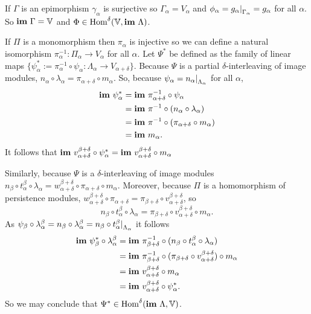  If $\Gamma$ is an epimorphism $\gamma_\alpha$ is surjective so $\Gamma_\alpha = V_\alpha$ and $\phi_{\alpha} = g_{\alpha}\mathord{\mid}_{\Gamma_\alpha} = g_\alpha$ for all $\alpha$.
  So $\mathbf{im}~\Gamma = \mathbb{V}$ and $\Phi\in\mathrm{Hom}^\delta(\mathbb{V},\mathbf{im}~\Lambda)$.

  If $\Pi$ is a monomorphism then $\pi_\alpha$ is injective so we can define a natural isomorphism $\pi_\alpha^{-1} : \Pi_\alpha\to V_\alpha$ for all $\alpha$.
  Let $\Psi^*$ be defined as the family of linear maps $\{\psi_\alpha^* := \pi^{-1}_\alpha \circ \psi_\alpha : \Lambda_\alpha\to V_{\alpha+\delta}\}$.
  Because $\Psi$ is a partial $\delta$-interleaving of image modules, $n_\alpha\circ\lambda_\alpha = \pi_{\alpha+\delta}\circ m_\alpha$.
  So, because $\psi_\alpha = n_\alpha\mathord{\mid}_{\Lambda_\alpha}$ for all $\alpha$,
  \begin{align*}
    \mathbf{im}~\psi_\alpha^* &= \mathbf{im}~\pi^{-1}_{\alpha+\delta}\circ\psi_\alpha\\
                      &= \mathbf{im}~\pi^{-1}\circ (n_\alpha\circ\lambda_\alpha)\\
                      &= \mathbf{im}~\pi^{-1}\circ (\pi_{\alpha+\delta}\circ m_\alpha)\\
                      &= \mathbf{im}~ m_\alpha.
  \end{align*}
  It follows that $\mathbf{im}~v_{\alpha+\delta}^{\beta+\delta}\circ\psi_\alpha^* = \mathbf{im}~v_{\alpha+\delta}^{\beta+\delta}\circ m_\alpha$

  Similarly, because $\Psi$ is a $\delta$-interleaving of image modules $n_\beta\circ t_\alpha^\beta\circ \lambda_\alpha = w_{\alpha+\delta}^{\beta+\delta}\circ\pi_{\alpha+\delta}\circ m_\alpha$.
  Moreover, because $\Pi$ is a homomorphism of persistence modules, $w_{\alpha+\delta}^{\beta+\delta}\circ\pi_{\alpha+\delta} = \pi_{\beta+\delta}\circ v_{\alpha+\delta}^{\beta+\delta}$, so
  \[ n_\beta\circ t_\alpha^\beta\circ \lambda_\alpha = \pi_{\beta+\delta}\circ v_{\alpha+\delta}^{\beta+\delta}\circ m_\alpha.\]
  As $\psi_\beta\circ\lambda_\alpha^\beta = n_\beta\circ\lambda_\alpha^\beta = n_\beta\circ t_\alpha^\beta\mathord{\mid}_{\Lambda_\alpha}$ it follows
  \begin{align*}
    \mathbf{im}~\psi_\beta^*\circ\lambda_\alpha^\beta &= \mathbf{im}~\pi^{-1}_{\beta+\delta}\circ (n_\beta\circ t_\alpha^\beta\circ\lambda_\alpha)\\
      &= \mathbf{im}~\pi^{-1}_{\beta+\delta}\circ (\pi_{\beta+\delta}\circ v_{\alpha+\delta}^{\beta+\delta})\circ m_\alpha\\
      &= \mathbf{im}~v_{\alpha+\delta}^{\beta+\delta}\circ m_\alpha\\
      &= \mathbf{im}~v_{\alpha+\delta}^{\beta+\delta}\circ\psi_\alpha^*.
  \end{align*}
  So we may conclude that $\Psi^*\in\mathrm{Hom}^\delta(\mathbf{im}~\Lambda,\mathbb{V})$.

